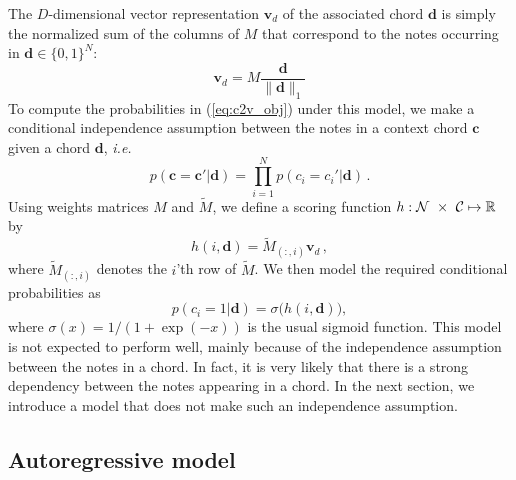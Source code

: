 \documentclass{article}
\newcommand{\M}{\tilde{M}}
\newcommand{\boldc}{\boldsymbol c}
\newcommand{\boldd}{\boldsymbol d}
\newcommand{\boldvd}{\boldsymbol v_d}
\newcommand{\ie}{\textit{i.e.}}
\begin{document}
The $D$-dimensional vector representation $\boldvd$ of the associated chord $\boldd$ is simply the normalized sum of the columns of $M$ that correspond to the notes occurring in $\boldd \in \{0,1\}^N$:
\[ \boldvd = M\frac{ \boldd}{\| \boldd \|_1}
\]
To compute the probabilities in (\ref{eq:c2v_obj}) under this model, we make a  conditional independence assumption between the notes in a context chord $\boldc$ given a chord $\boldd$, \ie\
%
\begin{equation}
p(\boldc =\boldc' | \boldd) = \prod_{i=1}^N  p(c_i =c_i'|  \boldd) \,.
\end{equation} 
%
Using weights matrices $M$ and $\M$, we define a scoring function $\nobreak{h: \mathcal{N}~\times~\mathcal{C}\mapsto\mathbb{R}}$ by
\begin{equation}
h(i,\boldd) =  \M_{(:,i)} \boldvd \,,
\end{equation}
where $\M_{(:,i)}$ denotes the $i$'th row of $\M$. We then model the required conditional probabilities as
\begin{equation}
p(c_i =1|\boldd) = \sigma\big( h(i,\boldd) \big),
\end{equation}
where $\sigma(x)=1/(1+\exp(-x))$ is the usual sigmoid function.
This model is not expected to perform well, mainly because of the independence assumption between the notes in a chord. In fact, it is very likely that there is a strong dependency between the notes appearing in a chord. In the next section, we introduce a model that does not make such an independence assumption. 

\subsection{Autoregressive model}
\end{document}
